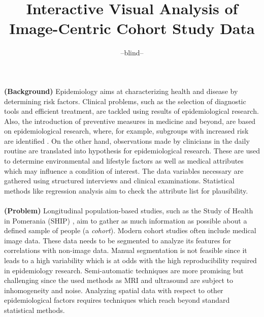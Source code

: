 \documentclass[journal]{style/vgtc} 			          %
\title{Interactive Visual Analysis of Image-Centric Cohort Study Data}
\author{--blind--}
\begin{document}


\maketitle

\textbf{(Background)} Epidemiology aims at characterizing health and disease by determining risk factors.
%
Clinical problems, such as the selection of diagnostic tools and efficient treatment, are tackled using results of epidemiological research.
%
Also, the introduction of preventive measures in medicine and beyond, are based on epidemiological research, where, for example, subgroups with increased risk are identified \cite{Fletcher2012}.
%
On the other hand, observations made by clinicians in the daily routine are translated into hypothesis for epidemiological research.
%
These are used to determine environmental and lifestyle factors as well as medical attributes which may influence a condition of interest.
%
The data variables necessary are gathered using structured interviews and clinical examinations.
%
Statistical methods like regression analysis aim to check the attribute list for plausibility.
%
\\\\
\textbf{(Problem)}
Longitudinal population-based studies, such as the Study of Health in Pomerania (SHIP) \cite{Volzke2011}, aim to gather as much information as possible about a defined sample of people (a \emph{cohort}).
%
%
Modern cohort studies often include medical image data.
%
These data needs to be segmented to analyze its features for correlations with non-image data.
%
Manual segmentation is not feasible since it leads to a high variability which is at odds with the high reproducibility required in epidemiology research.
%
Semi-automatic techniques are more promising but challenging since the used methods as MRI and ultrasound are subject to inhomogeneity and noise.
%
Analyzing spatial data with respect to other epidemiological factors requires techniques which reach beyond standard statistical methods.
\end{document}
